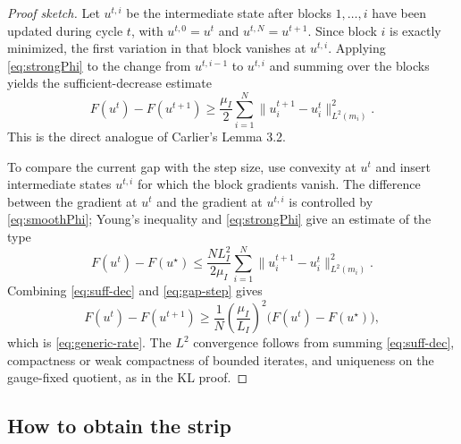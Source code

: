 \documentclass[11pt]{article}
\begin{document}
\begin{proof}[Proof sketch]
Let $u^{t,i}$ be the intermediate state after blocks $1,\ldots,i$ have been
updated during cycle $t$, with $u^{t,0}=u^t$ and $u^{t,N}=u^{t+1}$.  Since block
$i$ is exactly minimized, the first variation in that block vanishes at
$u^{t,i}$.  Applying \eqref{eq:strongPhi} to the change from $u^{t,i-1}$ to
$u^{t,i}$ and summing over the blocks yields the sufficient-decrease estimate
\begin{equation}\label{eq:suff-dec}
  F(u^t)-F(u^{t+1})
  \geq
  \frac{\mu_I}{2}
  \sum_{i=1}^N
  \|u_i^{t+1}-u_i^t\|_{L^2(m_i)}^2 .
\end{equation}
This is the direct analogue of Carlier's Lemma 3.2.

To compare the current gap with the step size, use convexity at $u^t$ and insert
intermediate states $u^{t,i}$ for which the block gradients vanish.  The
difference between the gradient at $u^t$ and the gradient at $u^{t,i}$ is
controlled by \eqref{eq:smoothPhi}; Young's inequality and
\eqref{eq:strongPhi} give an estimate of the type
\begin{equation}\label{eq:gap-step}
  F(u^t)-F(u^\star)
  \leq
  \frac{N L_I^2}{2\mu_I}
  \sum_{i=1}^N
  \|u_i^{t+1}-u_i^t\|_{L^2(m_i)}^2 .
\end{equation}
Combining \eqref{eq:suff-dec} and \eqref{eq:gap-step} gives
\begin{equation*}
  F(u^t)-F(u^{t+1})
  \geq
  \frac{1}{N}\left(\frac{\mu_I}{L_I}\right)^2
  \big(F(u^t)-F(u^\star)\big),
\end{equation*}
which is \eqref{eq:generic-rate}.  The $L^2$ convergence follows from summing
\eqref{eq:suff-dec}, compactness or weak compactness of bounded iterates, and
uniqueness on the gauge-fixed quotient, as in the KL proof.
\end{proof}

\subsection{How to obtain the strip}
\end{document}
